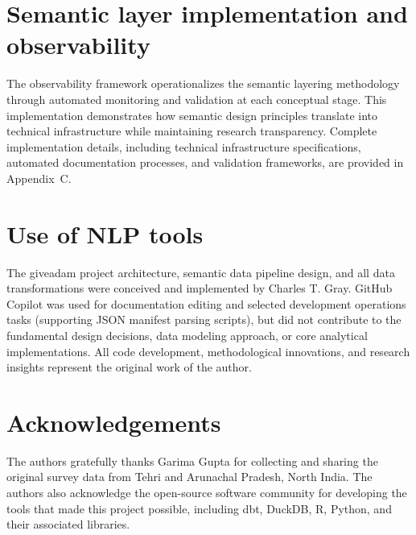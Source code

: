 \documentclass{article}
\begin{document}
\section{Semantic layer implementation and observability}
\label{sec:semantic-implementation}

The observability framework operationalizes the semantic layering methodology through automated monitoring and validation at each conceptual stage. This implementation demonstrates how semantic design principles translate into technical infrastructure while maintaining research transparency. Complete implementation details, including technical infrastructure specifications, automated documentation processes, and validation frameworks, are provided in Appendix~C.

\section{Use of NLP tools}

The giveadam project architecture, semantic data pipeline design, and all data transformations were conceived and implemented by Charles T. Gray. GitHub Copilot \cite{copilot} was used for documentation editing and selected development operations tasks (supporting JSON manifest parsing scripts), but did not contribute to the fundamental design decisions, data modeling approach, or core analytical implementations. All code development, methodological innovations, and research insights represent the original work of the author.

\section{Acknowledgements}

The authors gratefully thanks Garima Gupta for collecting and sharing the original survey data from Tehri and Arunachal Pradesh, North India. The authors also acknowledge the open-source software community for developing the tools that made this project possible, including dbt, DuckDB, R, Python, and their associated libraries.

\appendix









\end{document}
